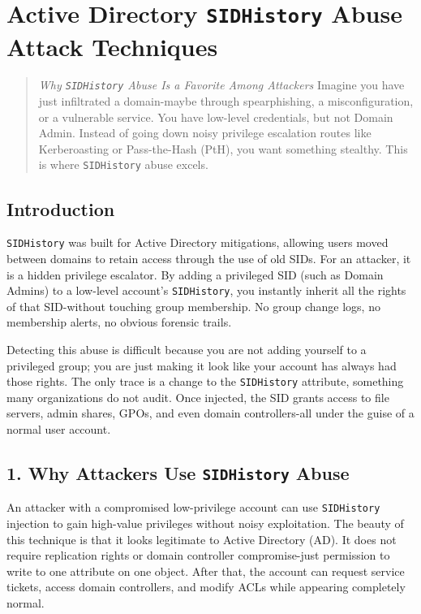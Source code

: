 \chapter{Active Directory \texttt{SIDHistory} Abuse Attack Techniques}

\begin{abstract}
{\textit{Why \texttt{SIDHistory} Abuse Is a Favorite Among Attackers}}
Imagine you have just infiltrated a domain-maybe through spearphishing, a misconfiguration, or a vulnerable service. You have low-level credentials, but not Domain Admin. Instead of going down noisy privilege escalation routes like Kerberoasting or Pass-the-Hash (PtH), you want something stealthy. This is where \texttt{SIDHistory} abuse excels.
\end{abstract}
\section{Introduction}
\texttt{SIDHistory} was built for Active Directory mitigations, allowing users moved between domains to retain access through the use of old SIDs. For an attacker, it is a hidden privilege escalator. By adding a privileged SID (such as Domain Admins) to a low-level account's \texttt{SIDHistory}, you instantly inherit all the rights of that SID-without touching group membership. No group change logs, no membership alerts, no obvious forensic trails.

Detecting this abuse is difficult because you are not adding yourself to a privileged group; you are just making it look like your account has always had those rights. The only trace is a change to the \texttt{SIDHistory} attribute, something many organizations do not audit. Once injected, the SID grants access to file servers, admin shares, GPOs, and even domain controllers-all under the guise of a normal user account.

\section{1. Why Attackers Use \texttt{SIDHistory} Abuse}
An attacker with a compromised low-privilege account can use \texttt{SIDHistory} injection to gain high-value privileges without noisy exploitation. The beauty of this technique is that it looks legitimate to Active Directory (AD). It does not require replication rights or domain controller compromise-just permission to write to one attribute on one object. After that, the account can request service tickets, access domain controllers, and modify ACLs while appearing completely normal.

